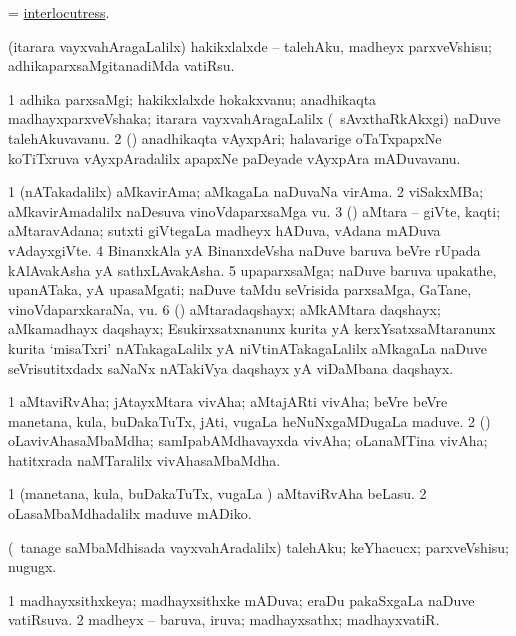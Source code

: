 \bentry
{}
\gl{\nA}
\bmng
= \hyperlink{interlocutress}{interlocutress}. 
\emng
\eentry

\bentry
{}
\gl{\akirx}
\bmng
(itarara vayxvahAragaLalilx) hakikxlalxde -- talehAku, madheyx parxveVshisu; adhikaparxsaMgitanadiMda vatiRsu. 
\emng
\eentry

\bentry
{}
\gl{\nA}
\bmng
\bnum
\num{1} adhika parxsaMgi; hakikxlalxde hokakxvanu; anadhikaqta madhayxparxveVshaka; itarara vayxvahAragaLalilx (\kanmu\ sAvxthaRkAkxgi) naDuve talehAkuvavanu. 
\num{2} (\ca) anadhikaqta vAyxpAri; halavarige oTaTxpapxNe koTiTxruva vAyxpAradalilx apapxNe paDeyade vAyxpAra mADuvavanu. 
\enum
\emng
\eentry

\bentry
{}
\gl{\nA}
\bmng
\bnum
\num{1} (nATakadalilx) aMkavirAma; aMkagaLa naDuvaNa virAma. 
\num{2} viSakxMBa; aMkavirAmadalilx naDesuva vinoVdaparxsaMga \mo vu. 
\num{3} (\saM) aMtara -- giVte, kaqti; aMtaravAdana; sutxti giVtegaLa madheyx hADuva, vAdana mADuva vAdayxgiVte. 
\num{4} BinanxkAla yA BinanxdeVsha naDuve baruva beVre rUpada kAlAvakAsha yA sathxLAvakAsha. 
\num{5} upaparxsaMga; naDuve baruva upakathe, upanATaka, yA upasaMgati; naDuve taMdu seVrisida parxsaMga, GaTane, vinoVdaparxkaraNa, \mo vu. 
\num{6} (\ca) aMtaradaqshayx; aMkAMtara daqshayx; aMkamadhayx daqshayx; Esukirxsatxnanunx kurita yA kerxYsatxsaMtaranunx kurita `misaTxri' nATakagaLalilx yA niVtinATakagaLalilx aMkagaLa naDuve seVrisutitxdadx saNaNx nATakiVya daqshayx yA viDaMbana daqshayx. 
\enum
\emng
\eentry

\bentry
{}
\gl{\nA}
\bmng
\bnum
\num{1} aMtaviRvAha; jAtayxMtara vivAha; aMtajARti vivAha; beVre beVre manetana, kula, buDakaTuTx, jAti, \mo vugaLa heNuNxgaMDugaLa maduve. 
\num{2} (\saDi) oLavivAhasaMbaMdha; samIpabAMdhavayxda vivAha; oLanaMTina vivAha; hatitxrada naMTaralilx vivAhasaMbaMdha. 
\enum
\emng
\eentry

\bentry
{}
\gl{\akirx}
\bmng
\bnum
\num{1} (manetana, kula, buDakaTuTx, \mo vugaLa \vi) aMtaviRvAha beLasu. 
\num{2} oLasaMbaMdhadalilx maduve mADiko. 
\enum
\emng
\eentry

\bentry
{}
\gl{\akirx}
\bmng
(\kanmu\ tanage saMbaMdhisada vayxvahAradalilx) talehAku; keYhacucx; parxveVshisu; nugugx. 
\emng
\eentry

\bentry
{}
\gl{\gu}
\bmng
\bnum
\num{1} madhayxsithxkeya; madhayxsithxke mADuva; eraDu pakaSxgaLa naDuve vatiRsuva. 
\num{2} madheyx -- baruva, iruva; madhayxsathx; madhayxvatiR. 
\enum
\emng
\eentry

